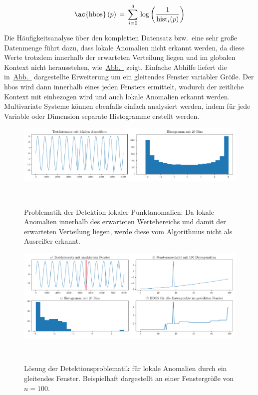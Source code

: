 \begin{equation}
    \text{\ac{hbos}}\,(p)\, =\, \sum_{i=0} ^ {d}\, \log \left( \frac{1}{\text{hist}_i(p)} \right)
\label{eq:hbos}
\end{equation}

Die Häufigkeitsanalyse über den kompletten Datensatz bzw.~eine sehr große Datenmenge führt dazu, dass lokale Anomalien nicht erkannt werden,
da diese Werte trotzdem innerhalb der erwarteten Verteilung liegen und im globalen Kontext nicht herausstehen,
wie~\hyperref[fig:hbos_lokale_probleme]{Abb.~} zeigt. Einfache Abhilfe liefert die
in~\hyperref[fig:hbos_lösung]{Abb.~} dargestellte Erweiterung um ein gleitendes Fenster variabler Größe. Der \ac{hbos} wird dann innerhalb
eines jeden Fensters ermittelt, wodurch der zeitliche Kontext mit einbezogen wird und auch lokale Anomalien erkannt werden. Multivariate Systeme
können ebenfalls einfach analysiert werden, indem für jede Variable oder Dimension separate Histogramme erstellt werden.

\begin{figure}[H]
    \centering
        \includegraphics[width=1\linewidth]{ch4_anomalien/abbildungen/hbos_lokal_problem.pdf}    
    \caption{\centering Problematik der Detektion lokaler Punktanomalien: Da lokale Anomalien innerhalb des erwarteten Wertebereichs und damit der erwarteten
    Verteilung liegen, werde diese vom Algorithmus nicht als Ausreißer erkannt.}
~\label{fig:hbos_lokale_probleme}
\end{figure}

\begin{figure}[H]
    \centering
        \includegraphics[width=1\linewidth]{ch4_anomalien/abbildungen/hbos_lokale_anomalien.pdf}    
    \caption{\centering Lösung der Detektionsproblematik für lokale Anomalien durch ein gleitendes Fenster. Beispielhaft dargestellt an einer Fenstergröße
    von $n=100$.}
~\label{fig:hbos_lösung}
\end{figure}

